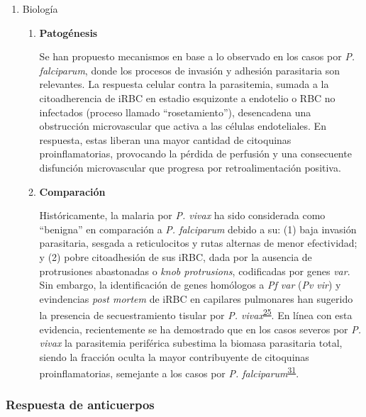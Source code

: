 \documentclass[a4paper]{article}
\begin{document}
\begin{enumerate}
\def\labelenumi{\alph{enumi}.}
\setcounter{enumi}{2}
\item
  Biología

  \begin{enumerate}
  \def\labelenumii{\roman{enumii}.}
  \item
    \textbf{Patogénesis}

    Se han propuesto mecanismos en base a lo observado en los casos por
    \emph{P. falciparum}, donde los procesos de invasión y adhesión
    parasitaria son relevantes. La respuesta celular contra la
    parasitemia, sumada a la citoadherencia de iRBC en estadio
    esquizonte a endotelio o RBC no infectados (proceso llamado
    ``rosetamiento''), desencadena una obstrucción microvascular que
    activa a las células endoteliales. En respuesta, estas liberan una
    mayor cantidad de citoquinas proinflamatorias, provocando la pérdida
    de perfusión y una consecuente disfunción microvascular que progresa
    por retroalimentación positiva.
  \item
    \textbf{Comparación}

    Históricamente, la malaria por \emph{P. vivax} ha sido considerada
    como ``benigna'' en comparación a \emph{P. falciparum} debido a su:
    (1) baja invasión parasitaria, sesgada a reticulocitos y rutas
    alternas de menor efectividad; y (2) pobre citoadhesión de sus iRBC,
    dada por la ausencia de protrusiones abastonadas o \emph{knob
    protrusions}, codificadas por genes \emph{var}. Sin embargo, la
    identificación de genes homólogos a \emph{Pf var} (\emph{Pv vir}) y
    evindencias \emph{post mortem} de iRBC en capilares pulmonares han
    sugerido la presencia de secuestramiento tisular por \emph{P.
    vivax}\textsuperscript{\protect\hyperlink{ref-wassmer2015}{25}}. En
    línea con esta evidencia, recientemente se ha demostrado que en los
    casos severos por \emph{P. vivax} la parasitemia periférica
    subestima la biomasa parasitaria total, siendo la fracción oculta la
    mayor contribuyente de citoquinas proinflamatorias, semejante a los
    casos por \emph{P.
    falciparum}\textsuperscript{\protect\hyperlink{ref-barber2015}{31}}.
  \end{enumerate}
\end{enumerate}

\subsubsection{Respuesta de anticuerpos}\label{respuesta-de-anticuerpos}
\end{document}
